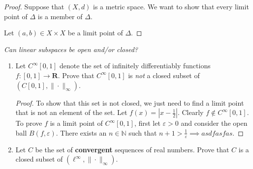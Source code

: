 \documentclass{article}
\newcommand{\R}{\mathbf{R}}
\theoremstyle{plain} %
\numberwithin{thm}{section} %
\theoremstyle{definition}
\begin{document}
        \begin{proof}
            Suppose that \((X,d)\) is a metric space. We want to show that every limit point of \(\Delta\) is a member of \(\Delta\).

            Let \((a,b) \in X\times X\) be a limit point of \(\Delta\).
        \end{proof}

    \exercise\textit{Can linear subspaces be open and/or closed?}

    \begin{enumerate}[label=(\alph*)]
        \item Let $C^\infty[0,1]$ denote the set of infinitely differentiably functions $f:[0,1]\rightarrow \R$. Prove that $C^\infty[0,1]$ is \textit{not} a closed subset of $(C[0,1],\|\cdot\|_\infty)$.

        \begin{proof}
            To show that this set is not closed, we just need to find a limit point that is not an element of the set. Let \(f(x) = |x-\frac{1}{2}|\). Clearly \(f \notin C^{\infty} [0,1]\). To prove \(f\) is a limit point of \(C^{\infty} [0,1]\), first let \(\varepsilon > 0\) and consider the open ball \(B(f, \varepsilon)\). There exists an \(n \in \mathbb{N}\) such that \(n + 1 > \frac{1}{\varepsilon} \implies asdfasfas\). 
            
        \end{proof}

        \item Let $C$ be the set of \textbf{convergent} sequences of real numbers. Prove that $C$ is a closed subset of $(\ell^\infty,\|\cdot\|_\infty)$.


\end{enumerate}
\end{document}
